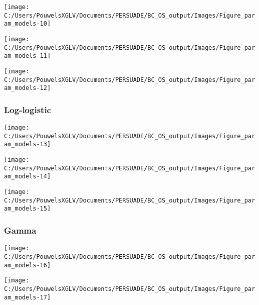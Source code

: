 \documentclass[
]{article}
\begin{document}
\begin{flushleft}\texttt{[image: C:/Users/PouwelsXGLV/Documents/PERSUADE/BC\_OS\_output/Images/Figure\_param\_models-10]} \end{flushleft}

\begin{flushleft}\texttt{[image: C:/Users/PouwelsXGLV/Documents/PERSUADE/BC\_OS\_output/Images/Figure\_param\_models-11]} \end{flushleft}

\begin{flushleft}\texttt{[image: C:/Users/PouwelsXGLV/Documents/PERSUADE/BC\_OS\_output/Images/Figure\_param\_models-12]} \end{flushleft}

\clearpage

\subsubsection{Log-logistic}\label{log-logistic}

\begin{flushleft}\texttt{[image: C:/Users/PouwelsXGLV/Documents/PERSUADE/BC\_OS\_output/Images/Figure\_param\_models-13]} \end{flushleft}

\begin{flushleft}\texttt{[image: C:/Users/PouwelsXGLV/Documents/PERSUADE/BC\_OS\_output/Images/Figure\_param\_models-14]} \end{flushleft}

\begin{flushleft}\texttt{[image: C:/Users/PouwelsXGLV/Documents/PERSUADE/BC\_OS\_output/Images/Figure\_param\_models-15]} \end{flushleft}

\clearpage

\subsubsection{Gamma}\label{gamma}

\begin{flushleft}\texttt{[image: C:/Users/PouwelsXGLV/Documents/PERSUADE/BC\_OS\_output/Images/Figure\_param\_models-16]} \end{flushleft}

\begin{flushleft}\texttt{[image: C:/Users/PouwelsXGLV/Documents/PERSUADE/BC\_OS\_output/Images/Figure\_param\_models-17]} \end{flushleft}
\end{document}
